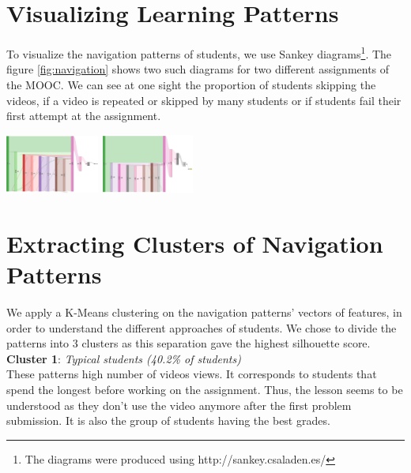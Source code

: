 \documentclass[a0,portrait]{a0poster}
\begin{document}
\begin{minipage}[c]{\linewidth}
\begin{framed}
\begin{multicols}{2}
\section*{Visualizing Learning Patterns}
To visualize the navigation patterns of students, we use Sankey diagrams\footnote{The diagrams were produced using http://sankey.csaladen.es/}. The figure \ref{fig:navigation} shows two such diagrams for two different assignments of the MOOC. We can see at one sight the proportion of students skipping the videos, if a video is repeated or skipped by many students or if students fail their first attempt at the assignment.

\begin{center}
\includegraphics[width=0.23\textwidth]{figures/7}
\includegraphics[width=0.23\textwidth]{figures/23}
\end{center}
\label{fig:navigation}

\section*{Extracting Clusters of Navigation Patterns}
We apply a K-Means clustering on the navigation patterns' vectors of features, in order to understand the different approaches of students. We chose to divide the patterns into 3 clusters as this separation gave the highest silhouette score. \\

\textbf{Cluster 1}: \textit{Typical students (40.2\% of students)} \\
These patterns high number of videos views. It corresponds to students that spend the longest before working on the assignment. Thus, the lesson seems to be understood as they don't use the video anymore after the first problem submission. It is also the group of students having the best grades.


\end{multicols}
\end{framed}
\end{minipage}
\end{document}
